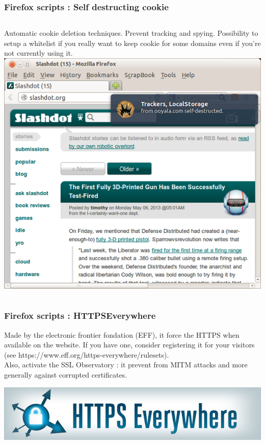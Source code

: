 \begin{frame}
\frametitle{Firefox scripts : Self destructing cookie}

\begin{columns}[c]
Automatic cookie deletion techniques. Prevent tracking and spying.
Possibility to setup a whitelist if you really want to keep cookie for some
domains even if you're not currently using it.
\includegraphics[width=\linewidth] {./materials/selfdestructingcookie.png}
\end{columns}
\end{frame}
\begin{frame}
\frametitle{Firefox scripts : HTTPSEverywhere}
Made by the electronic frontier fondation (EFF), it force the HTTPS when
available on the website. If you have one, consider registering it for your
visitors (see https://www.eff.org/https-everywhere/rulesets).
\\
Also, activate the SSL Observatory : it prevent from MITM attacks and more
generally against corrupted certificates.
\begin{center}
\includegraphics[scale=0.4] {./materials/https-everywhere.jpg}
\end{center}

\end{frame}
